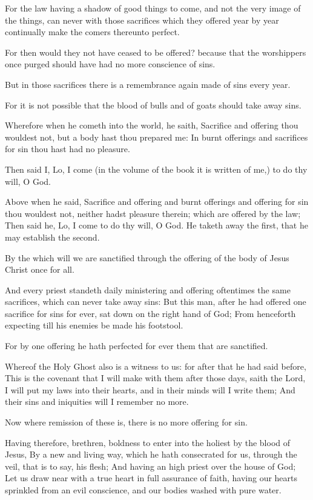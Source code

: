 \Chapter
\Verse For the law having a shadow of good things to come, and not the very image of the things, can never with those sacrifices which they offered year by year continually make the comers thereunto perfect.

\Verse For then would they not have ceased to be offered? because that the worshippers once purged should have had no more conscience of sins.

\Verse But in those sacrifices there is a remembrance again made of sins every year.

\Verse For it is not possible that the blood of bulls and of goats should take away sins.

\Verse Wherefore when he cometh into the world, he saith, Sacrifice and offering thou wouldest not, but a body hast thou prepared me: \Verse In burnt offerings and sacrifices for sin thou hast had no pleasure.

\Verse Then said I, Lo, I come (in the volume of the book it is written of me,) to do thy will, O God.

\Verse Above when he said, Sacrifice and offering and burnt offerings and offering for sin thou wouldest not, neither hadst pleasure therein; which are offered by the law; \Verse Then said he, Lo, I come to do thy will, O God. He taketh away the first, that he may establish the second.

\Verse By the which will we are sanctified through the offering of the body of Jesus Christ once for all.

\Verse And every priest standeth daily ministering and offering oftentimes the same sacrifices, which can never take away sins: \Verse But this man, after he had offered one sacrifice for sins for ever, sat down on the right hand of God; \Verse From henceforth expecting till his enemies be made his footstool.

\Verse For by one offering he hath perfected for ever them that are sanctified.

\Verse Whereof the Holy Ghost also is a witness to us: for after that he had said before, \Verse This is the covenant that I will make with them after those days, saith the Lord, I will put my laws into their hearts, and in their minds will I write them; \Verse And their sins and iniquities will I remember no more.

\Verse Now where remission of these is, there is no more offering for sin.

\Verse Having therefore, brethren, boldness to enter into the holiest by the blood of Jesus, \Verse By a new and living way, which he hath consecrated for us, through the veil, that is to say, his flesh; \Verse And having an high priest over the house of God; \Verse Let us draw near with a true heart in full assurance of faith, having our hearts sprinkled from an evil conscience, and our bodies washed with pure water.

